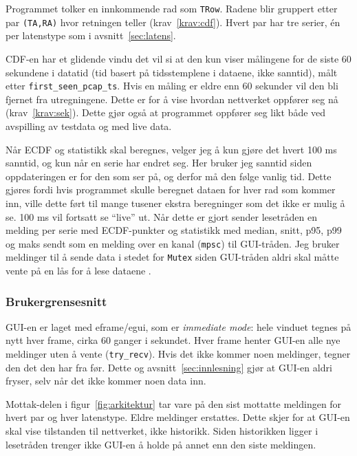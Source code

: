\documentclass[norsk]{uiobachelorthesis}
\begin{document}
Programmet tolker en innkommende rad som \texttt{TRow}. Radene blir gruppert etter par \texttt{(TA,RA)} hvor retningen teller (krav~\ref{krav:cdf}). Hvert par har tre serier, én per latenstype som i avsnitt~\ref{sec:latens}.

CDF-en har et glidende vindu det vil si at den kun viser målingene for de siste 60 sekundene i datatid (tid basert på tidsstemplene i dataene, ikke sanntid), målt etter \texttt{first\_seen\_pcap\_ts}. Hvis en måling er eldre enn 60 sekunder vil den bli fjernet fra utregningene. Dette er for å vise hvordan nettverket oppfører seg nå (krav~\ref{krav:sek}). Dette gjør også at programmet oppfører seg likt både ved avspilling av testdata og med live data.

Når ECDF og statistikk skal beregnes, velger jeg å kun gjøre det hvert 100 ms sanntid, og kun når en serie har endret seg. Her bruker jeg sanntid siden oppdateringen er for den som ser på, og derfor må den følge vanlig tid. Dette gjøres fordi hvis programmet skulle beregnet dataen for hver rad som kommer inn, ville dette ført til mange tusener ekstra beregninger som det ikke er mulig å se. 100 ms vil fortsatt se \enquote{live} ut.
Når dette er gjort sender lesetråden en melding per serie med ECDF-punkter og statistikk med median, snitt, p95, p99 og maks sendt som en melding over en kanal (\texttt{mpsc}) til GUI-tråden. Jeg bruker meldinger til å sende data i stedet for \texttt{Mutex} siden GUI-tråden aldri skal måtte vente på en lås for å lese dataene \parencite{rustbook-mpsc}.
 
\subsubsection{Brukergrensesnitt}
GUI-en er laget med eframe/egui, som er \emph{immediate mode}: hele vinduet tegnes på nytt hver frame, cirka 60 ganger i sekundet. Hver frame henter GUI-en alle nye meldinger uten å vente (\texttt{try\_recv}). Hvis det ikke kommer noen meldinger, tegner den det den har fra før. Dette og avsnitt~\ref{sec:innlesning} gjør at GUI-en aldri fryser, selv når det ikke kommer noen data inn.

Mottak-delen i figur~\ref{fig:arkitektur} tar vare på den sist mottatte meldingen for hvert par og hver latenstype. Eldre meldinger erstattes. Dette skjer for at GUI-en skal vise tilstanden til nettverket, ikke historikk. Siden historikken ligger i lesetråden trenger ikke GUI-en å holde på annet enn den siste meldingen.
\end{document}

